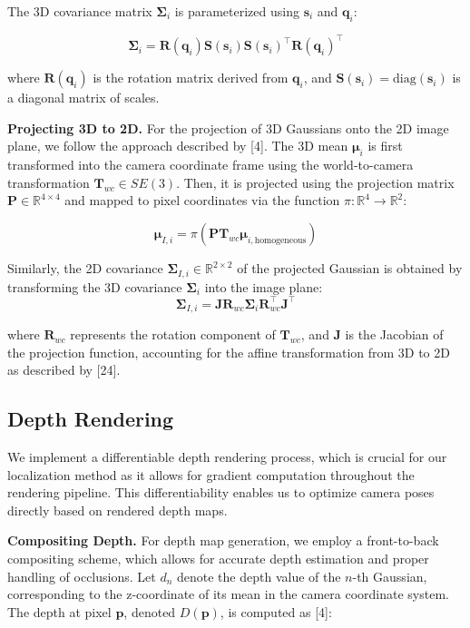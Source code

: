 \documentclass[twocolumn]{article} %
\begin{document}
The 3D covariance matrix \(\boldsymbol{\Sigma}_i\) is parameterized
using \(\mathbf{s}_i\) and \(\mathbf{q}_i\):

\[
\boldsymbol{\Sigma}_i = \mathbf{R}(\mathbf{q}_i) \mathbf{S}(\mathbf{s}_i) \mathbf{S}(\mathbf{s}_i)^\top \mathbf{R}(\mathbf{q}_i)^\top
\]

where \(\mathbf{R}(\mathbf{q}_i)\) is the rotation matrix derived from
\(\mathbf{q}_i\), and
\(\mathbf{S}(\mathbf{s}_i) = \text{diag}(\mathbf{s}_i)\) is a diagonal
matrix of scales.

\textbf{Projecting 3D to 2D.} For the projection of 3D Gaussians onto
the 2D image plane, we follow the approach described by {[}4{]}. The 3D
mean \(\boldsymbol{\mu}_i\) is first transformed into the camera
coordinate frame using the world-to-camera transformation
\(\mathbf{T}_{wc} \in SE(3)\). Then, it is projected using the
projection matrix \(\mathbf{P} \in \mathbb{R}^{4 \times 4}\) and mapped
to pixel coordinates via the function
\(\pi: \mathbb{R}^4 \rightarrow \mathbb{R}^2\):

\[
\boldsymbol{\mu}_{I,i} = \pi\left( \mathbf{P} \mathbf{T}_{wc} \boldsymbol{\mu}_{i,\text{homogeneous}} \right)
\]

Similarly, the 2D covariance
\(\boldsymbol{\Sigma}_{I,i} \in \mathbb{R}^{2\times2}\) of the projected
Gaussian is obtained by transforming the 3D covariance
\(\boldsymbol{\Sigma}_i\) into the image plane: \[
\boldsymbol{\Sigma}_{I,i} = \mathbf{J} \mathbf{R}_{wc} \boldsymbol{\Sigma}_i \mathbf{R}_{wc}^\top \mathbf{J}^\top
\]

where \(\mathbf{R}_{wc}\) represents the rotation component of
\(\mathbf{T}_{wc}\), and \(\mathbf{J}\) is the Jacobian of the
projection function, accounting for the affine transformation from 3D to
2D as described by {[}24{]}.

\subsection{Depth Rendering}\label{depth-rendering}

We implement a differentiable depth rendering process, which is crucial
for our localization method as it allows for gradient computation
throughout the rendering pipeline. This differentiability enables us to
optimize camera poses directly based on rendered depth maps.

\textbf{Compositing Depth.} For depth map generation, we employ a
front-to-back compositing scheme, which allows for accurate depth
estimation and proper handling of occlusions. Let \(d_n\) denote the
depth value of the \(n\)-th Gaussian, corresponding to the z-coordinate
of its mean in the camera coordinate system. The depth at pixel
\(\mathbf{p}\), denoted \(D(\mathbf{p})\), is computed as {[}4{]}:
\end{document}
